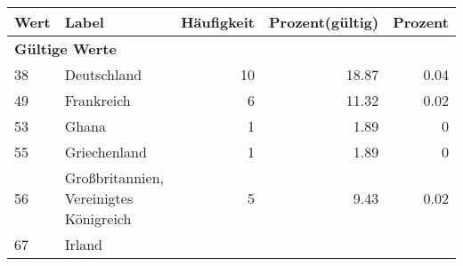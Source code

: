      \begin{longtable}{lXrrr}
     \toprule
     \textbf{Wert} & \textbf{Label} & \textbf{Häufigkeit} & \textbf{Prozent(gültig)} & \textbf{Prozent} \\
     \endhead
     \midrule
     \multicolumn{5}{l}{\textbf{Gültige Werte}}\\

     38 &
     \multicolumn{1}{X}{ Deutschland   } &


       \num{10} &
       \num[round-mode=places,round-precision=2]{18.87} &
         \num[round-mode=places,round-precision=2]{0.04} \\

     49 &
     \multicolumn{1}{X}{ Frankreich   } &


       \num{6} &
       \num[round-mode=places,round-precision=2]{11.32} &
         \num[round-mode=places,round-precision=2]{0.02} \\

     53 &
     \multicolumn{1}{X}{ Ghana   } &


       \num{1} &
       \num[round-mode=places,round-precision=2]{1.89} &
         \num[round-mode=places,round-precision=2]{0} \\

     55 &
     \multicolumn{1}{X}{ Griechenland   } &


       \num{1} &
       \num[round-mode=places,round-precision=2]{1.89} &
         \num[round-mode=places,round-precision=2]{0} \\

     56 &
     \multicolumn{1}{X}{ Großbritannien, Vereinigtes Königreich   } &


       \num{5} &
       \num[round-mode=places,round-precision=2]{9.43} &
         \num[round-mode=places,round-precision=2]{0.02} \\

     67 &
     \multicolumn{1}{X}{ Irland   } &



\end{longtable}
